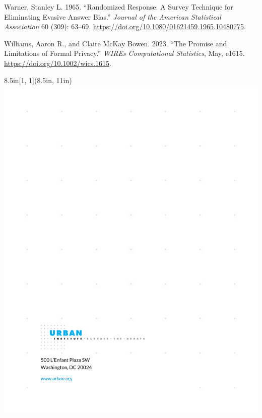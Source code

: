 \documentclass[
]{urban-formatting}
\newlength{\cslhangindent}
\newlength{\cslentryspacingunit} %
\newenvironment{CSLReferences}[2] %
 {%
  \setlength{\parindent}{0pt}
  \ifodd #1
  \let\oldpar\par
  \def\par{\hangindent=\cslhangindent\oldpar}
  \fi
  \setlength{\parskip}{#2\cslentryspacingunit}
 }%
 {}
\begin{document}
\begin{CSLReferences}{1}{0}
\leavevmode{}%
Warner, Stanley L. 1965. {``Randomized Response: A Survey Technique for
Eliminating Evasive Answer Bias.''} \emph{Journal of the American
Statistical Association} 60 (309): 63--69.
\url{https://doi.org/10.1080/01621459.1965.10480775}.

\leavevmode{}%
Williams, Aaron R., and Claire McKay Bowen. 2023. {``The Promise and
Limitations of Formal Privacy.''} \emph{WIREs Computational Statistics},
May, e1615. \url{https://doi.org/10.1002/wics.1615}.

\end{CSLReferences}



\newpage
\thispagestyle{empty}

\begin{textblock*}{8.5in}[1, 1](8.5in, 11in)
    \noindent\includegraphics[width=\paperwidth,height=\paperheight]{images/back.pdf}
\end{textblock*}
\end{document}
